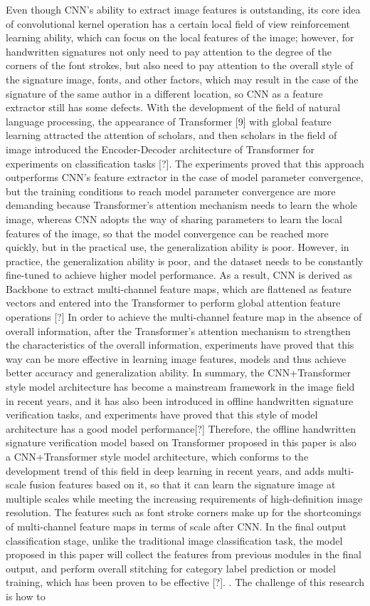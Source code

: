 Even though CNN's ability to extract image features is outstanding, its core idea of convolutional kernel operation has a certain local field of view reinforcement learning ability, which can focus on the local features of the image; however, for handwritten signatures not only need to pay attention to the degree of the corners of the font strokes, but also need to pay attention to the overall style of the signature image, fonts, and other factors, which may result in the case of the signature of the same author in a different location, so CNN as a feature extractor still has some defects. With the development of the field of natural language processing, the appearance of Transformer [9] with global feature learning attracted the attention of scholars, and then scholars in the field of image introduced the Encoder-Decoder architecture of Transformer for experiments on classification tasks [?]. The experiments proved that this approach outperforms CNN's feature extractor in the case of model parameter convergence, but the training conditions to reach model parameter convergence are more demanding because Transformer's attention mechanism needs to learn the whole image, whereas CNN adopts the way of sharing parameters to learn the local features of the image, so that the model convergence can be reached more quickly, but in the practical use, the generalization ability is poor. However, in practice, the generalization ability is poor, and the dataset needs to be constantly fine-tuned to achieve higher model performance. As a result, CNN is derived as Backbone to extract multi-channel feature maps, which are flattened as feature vectors and entered into the Transformer to perform global attention feature operations [?] In order to achieve the multi-channel feature map in the absence of overall information, after the Transformer's attention mechanism to strengthen the characteristics of the overall information, experiments have proved that this way can be more effective in learning image features, models and thus achieve better accuracy and generalization ability. In summary, the CNN+Transformer style model architecture has become a mainstream framework in the image field in recent years, and it has also been introduced in offline handwritten signature verification tasks, and experiments have proved that this style of model architecture has a good model performance[?] Therefore, the offline handwritten signature verification model based on Transformer proposed in this paper is also a CNN+Transformer style model architecture, which conforms to the development trend of this field in deep learning in recent years, and adds multi-scale fusion features based on it, so that it can learn the signature image at multiple scales while meeting the increasing requirements of high-definition image resolution. The features such as font stroke corners make up for the shortcomings of multi-channel feature maps in terms of scale after CNN. In the final output classification stage, unlike the traditional image classification task, the model proposed in this paper will collect the features from previous modules in the final output, and perform overall stitching for category label prediction or model training, which has been proven to be effective [?]. . The challenge of this research is how to 